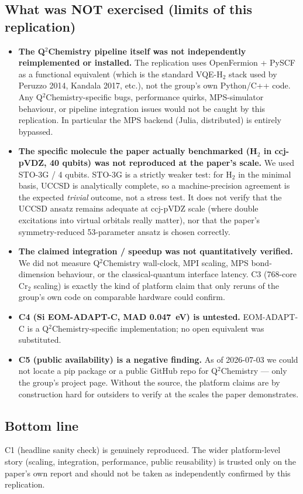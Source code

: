 \documentclass[11pt]{article}
\begin{document}
\subsection*{What was NOT exercised (limits of this
replication)}
\begin{itemize}
  \item \textbf{The Q$^2$Chemistry pipeline itself was not
        independently reimplemented or installed.} The
        replication uses OpenFermion + PySCF as a functional
        equivalent (which is the standard VQE-H$_2$ stack used by
        Peruzzo 2014, Kandala 2017, etc.), not the group's own
        Python/C++ code. Any Q$^2$Chemistry-specific bugs,
        performance quirks, MPS-simulator behaviour, or pipeline
        integration issues would not be caught by this
        replication. In particular the MPS backend (Julia,
        distributed) is entirely bypassed.
  \item \textbf{The specific molecule the paper actually
        benchmarked (H$_2$ in ccj-pVDZ, 40 qubits) was not
        reproduced at the paper's scale.} We used STO-3G / 4
        qubits. STO-3G is a strictly weaker test: for H$_2$ in
        the minimal basis, UCCSD is analytically complete, so a
        machine-precision agreement is the expected \emph{trivial}
        outcome, not a stress test. It does not verify that the
        UCCSD ansatz remains adequate at ccj-pVDZ scale (where
        double excitations into virtual orbitals really matter),
        nor that the paper's symmetry-reduced 53-parameter ansatz
        is chosen correctly.
  \item \textbf{The claimed integration / speedup was not
        quantitatively verified.} We did not measure Q$^2$Chemistry
        wall-clock, MPI scaling, MPS bond-dimension behaviour, or
        the classical-quantum interface latency. C3 (768-core
        Cr$_2$ scaling) is exactly the kind of platform claim
        that only reruns of the group's own code on comparable
        hardware could confirm.
  \item \textbf{C4 (Si EOM-ADAPT-C, MAD 0.047~eV) is untested.}
        EOM-ADAPT-C is a Q$^2$Chemistry-specific implementation;
        no open equivalent was substituted.
  \item \textbf{C5 (public availability) is a negative finding.}
        As of 2026-07-03 we could not locate a pip package or a
        public GitHub repo for Q$^2$Chemistry --- only the group's
        project page. Without the source, the platform claims are
        by construction hard for outsiders to verify at the
        scales the paper demonstrates.
\end{itemize}

\subsection*{Bottom line}
C1 (headline sanity check) is genuinely reproduced. The wider
platform-level story (scaling, integration, performance,
public reusability) is trusted only on the paper's own report and
should not be taken as independently confirmed by this
replication.


\end{document}
